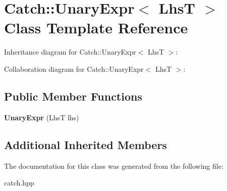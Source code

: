 \hypertarget{classCatch_1_1UnaryExpr}{}\section{Catch\+:\+:Unary\+Expr$<$ LhsT $>$ Class Template Reference}
\label{classCatch_1_1UnaryExpr}


Inheritance diagram for Catch\+:\+:Unary\+Expr$<$ LhsT $>$\+:


Collaboration diagram for Catch\+:\+:Unary\+Expr$<$ LhsT $>$\+:
\subsection*{Public Member Functions}
\begin{DoxyCompactItemize}
\item 
\mbox{\label{classCatch_1_1UnaryExpr_ae02f666a1e64da728628aa2033e1d6e7}} 
{\bfseries Unary\+Expr} (LhsT lhs)
\end{DoxyCompactItemize}
\subsection*{Additional Inherited Members}


The documentation for this class was generated from the following file\+:\begin{DoxyCompactItemize}
\item 
catch.\+hpp\end{DoxyCompactItemize}

